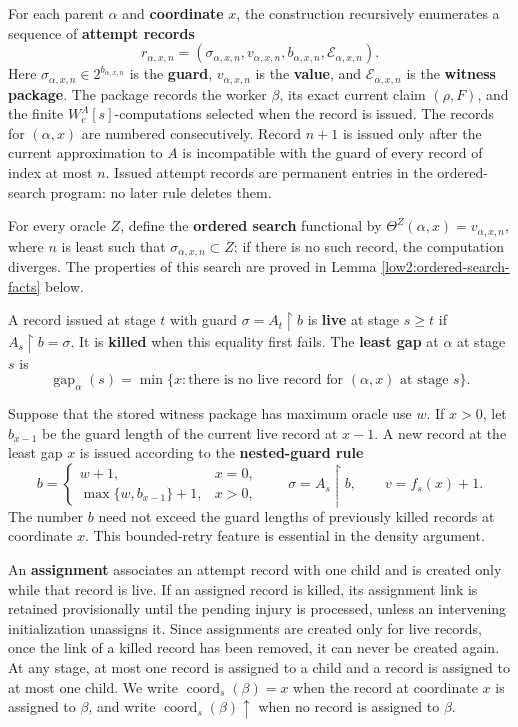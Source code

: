 \documentclass[11pt]{amsart}
\begin{document}
For each parent $\alpha$ and \textbf{coordinate} $x$, the construction recursively
enumerates a sequence of \textbf{attempt records}
\[
 r_{\alpha,x,n}=
 (\sigma_{\alpha,x,n},v_{\alpha,x,n},b_{\alpha,x,n},
   \mathcal E_{\alpha,x,n}).
\]
Here $\sigma_{\alpha,x,n}\in2^{b_{\alpha,x,n}}$ is the \textbf{guard},
$v_{\alpha,x,n}$ is the \textbf{value}, and $\mathcal E_{\alpha,x,n}$ is the
\textbf{witness package}. The package records the worker $\beta$, its exact
current claim $(\rho,F)$, and the finite
$W_e^A[s]$-computations selected when the record is issued. The records for
$(\alpha,x)$ are numbered consecutively. Record $n+1$ is issued only after
the current approximation to $A$ is incompatible with the guard of every
record of index at most $n$. Issued attempt records are permanent entries in
the ordered-search program: no later rule deletes them.

For every oracle $Z$, define the \textbf{ordered search} functional by $\Theta^Z(\alpha,x)=v_{\alpha,x,n}$,
where $n$ is least such that $\sigma_{\alpha,x,n}\subset Z$; if there is no
such record, the computation diverges. The properties of this search are
proved in Lemma \ref{low2:ordered-search-facts} below.

A record issued at stage $t$ with guard $\sigma=A_t\upharpoonright b$ is
\textbf{live} at stage $s\geq t$ if $A_s\upharpoonright b=\sigma$. It is
\textbf{killed} when this equality first fails. The \textbf{least gap} at
$\alpha$ at stage $s$ is
\[
        \operatorname{gap}_\alpha(s)=
        \min\{x:\text{there is no live record for }(\alpha,x) \text{ at stage }s\}.
\]

Suppose that the stored witness package has maximum oracle use $w$. If $x>0$,
let $b_{x-1}$ be the guard length of the current live record at $x-1$. A new
record at the least gap $x$ is issued according to the \textbf{nested-guard
rule}
\begin{equation}\label{low2:nested-guard}
 b=
 \begin{cases}
     w+1, & x=0,\\
     \max\{w,b_{x-1}\}+1, & x>0,
 \end{cases}
 \qquad
 \sigma=A_s\upharpoonright b,
 \qquad
 v=f_s(x)+1.
\end{equation}
The number $b$ need not exceed the guard lengths of previously killed records
at coordinate $x$. This bounded-retry feature is essential in the density
argument.

An \textbf{assignment} associates an attempt record with one child and is
created only while that record is live. If an assigned record is killed, its
assignment link is retained provisionally until the pending injury is
processed, unless an intervening initialization unassigns it. Since
assignments are created only for live records, once the link of a killed
record has been removed, it can never be created again. At any stage, at most
one record is assigned to a child and a record is assigned to at most one
child. We write
$\operatorname{coord}_s(\beta)=x$ when the record at coordinate $x$ is
assigned to $\beta$, and write $\operatorname{coord}_s(\beta)\uparrow$ when
no record is assigned to $\beta$.
\end{document}
